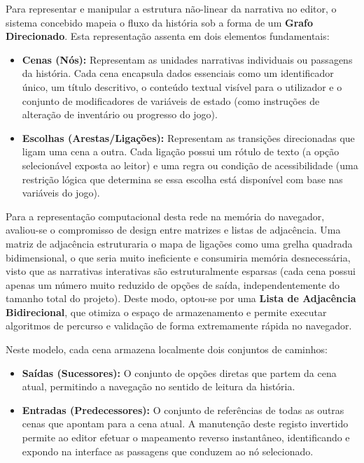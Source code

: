 Para representar e manipular a estrutura não-linear da narrativa no editor, o sistema concebido mapeia o fluxo da história sob a forma de um \textbf{Grafo Direcionado}. Esta representação assenta em dois elementos fundamentais:

\begin{itemize}
    \item \textbf{Cenas (Nós):} Representam as unidades narrativas individuais ou passagens da história. Cada cena encapsula dados essenciais como um identificador único, um título descritivo, o conteúdo textual visível para o utilizador e o conjunto de modificadores de variáveis de estado (como instruções de alteração de inventário ou progresso do jogo).
    
    \item \textbf{Escolhas (Arestas/Ligações):} Representam as transições direcionadas que ligam uma cena a outra. Cada ligação possui um rótulo de texto (a opção selecionável exposta ao leitor) e uma regra ou condição de acessibilidade (uma restrição lógica que determina se essa escolha está disponível com base nas variáveis do jogo).
\end{itemize}

Para a representação computacional desta rede na memória do navegador, avaliou-se o compromisso de design entre matrizes e listas de adjacência. Uma matriz de adjacência estruturaria o mapa de ligações como uma grelha quadrada bidimensional, o que seria muito ineficiente e consumiria memória desnecessária, visto que as narrativas interativas são estruturalmente esparsas (cada cena possui apenas um número muito reduzido de opções de saída, independentemente do tamanho total do projeto). Deste modo, optou-se por uma \textbf{Lista de Adjacência Bidirecional}, que otimiza o espaço de armazenamento e permite executar algoritmos de percurso e validação de forma extremamente rápida no navegador.

Neste modelo, cada cena armazena localmente dois conjuntos de caminhos:
\begin{itemize}
    \item \textbf{Saídas (Sucessores):} O conjunto de opções diretas que partem da cena atual, permitindo a navegação no sentido de leitura da história.
    \item \textbf{Entradas (Predecessores):} O conjunto de referências de todas as outras cenas que apontam para a cena atual. A manutenção deste registo invertido permite ao editor efetuar o mapeamento reverso instantâneo, identificando e expondo na interface as passagens que conduzem ao nó selecionado.
\end{itemize}

